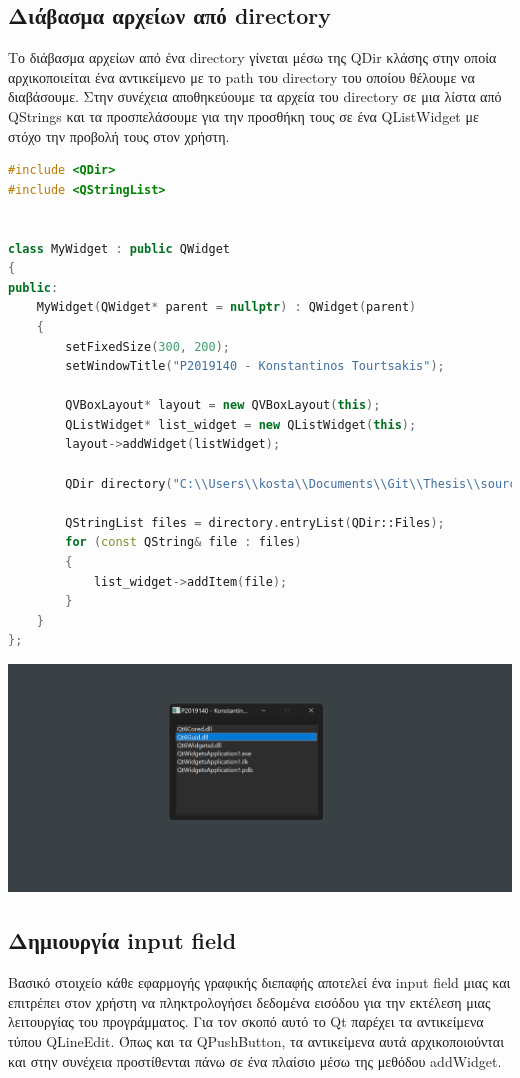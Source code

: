 \subsection{Διάβασμα αρχείων από directory}
Το διάβασμα αρχείων από ένα directory γίνεται μέσω της QDir κλάσης στην οποία
αρχικοποιείται ένα αντικείμενο με το path του directory του οποίου θέλουμε να
διαβάσουμε. Στην συνέχεια αποθηκεύουμε τα αρχεία του directory σε μια λίστα
από QStrings και τα προσπελάσουμε για την προσθήκη τους σε ένα QListWidget
με στόχο την προβολή τους στον χρήστη.
\begin{lstlisting}[language=C++, style=cppstyle]
#include <QDir>
#include <QStringList>


class MyWidget : public QWidget 
{
public:
    MyWidget(QWidget* parent = nullptr) : QWidget(parent) 
    {
        setFixedSize(300, 200);
        setWindowTitle("P2019140 - Konstantinos Tourtsakis");

        QVBoxLayout* layout = new QVBoxLayout(this);
        QListWidget* list_widget = new QListWidget(this);
        layout->addWidget(listWidget);

        QDir directory("C:\\Users\\kosta\\Documents\\Git\\Thesis\\source\\x64\\Debug");

        QStringList files = directory.entryList(QDir::Files);
        for (const QString& file : files) 
        {
            list_widget->addItem(file);
        }
    }
};
\end{lstlisting}

\includegraphics[width=1.0\textwidth]{./images/QDir_file_reading.png}

\subsection{Δημιουργία input field}
Βασικό στοιχείο κάθε εφαρμογής γραφικής διεπαφής αποτελεί ένα input field μιας
και επιτρέπει στον χρήστη να πληκτρολογήσει δεδομένα εισόδου για την εκτέλεση
μιας λειτουργίας του προγράμματος. Για τον σκοπό αυτό το Qt παρέχει τα αντικείμενα
τύπου QLineEdit. Όπως και τα QPushButton, τα αντικείμενα αυτά αρχικοποιούνται
και στην συνέχεια προστίθενται πάνω σε ένα πλαίσιο μέσω της μεθόδου addWidget.


